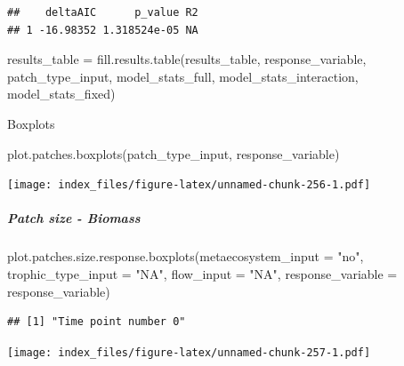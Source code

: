 \documentclass[
]{article}
\newenvironment{Shaded}{\begin{snugshade}}{\end{snugshade}}
\newcommand{\AttributeTok}[1]{\textcolor[rgb]{0.77,0.63,0.00}{#1}}
\newcommand{\FunctionTok}[1]{\textcolor[rgb]{0.00,0.00,0.00}{#1}}
\newcommand{\NormalTok}[1]{#1}
\newcommand{\OtherTok}[1]{\textcolor[rgb]{0.56,0.35,0.01}{#1}}
\newcommand{\StringTok}[1]{\textcolor[rgb]{0.31,0.60,0.02}{#1}}
\begin{document}
\begin{verbatim}
##    deltaAIC      p_value R2
## 1 -16.98352 1.318524e-05 NA
\end{verbatim}

\begin{Shaded}
\begin{Highlighting}[]
\NormalTok{results\_table }\OtherTok{=} \FunctionTok{fill.results.table}\NormalTok{(results\_table,}
\NormalTok{                                   response\_variable,}
\NormalTok{                                   patch\_type\_input,}
\NormalTok{                                   model\_stats\_full,}
\NormalTok{                                   model\_stats\_interaction,}
\NormalTok{                                   model\_stats\_fixed)}
\end{Highlighting}
\end{Shaded}

Boxplots

\begin{Shaded}
\begin{Highlighting}[]
\FunctionTok{plot.patches.boxplots}\NormalTok{(patch\_type\_input,}
\NormalTok{                       response\_variable)}
\end{Highlighting}
\end{Shaded}

\texttt{[image: index\_files/figure-latex/unnamed-chunk-256-1.pdf]}

\hypertarget{patch-size---biomass-1}{%
\subparagraph{Patch size - Biomass}\label{patch-size---biomass-1}}

\begin{Shaded}
\begin{Highlighting}[]
\FunctionTok{plot.patches.size.response.boxplots}\NormalTok{(}\AttributeTok{metaecosystem\_input =} \StringTok{"no"}\NormalTok{,}
                                  \AttributeTok{trophic\_type\_input =} \StringTok{"NA"}\NormalTok{,}
                                  \AttributeTok{flow\_input =} \StringTok{"NA"}\NormalTok{,}
                                  \AttributeTok{response\_variable =}\NormalTok{ response\_variable)}
\end{Highlighting}
\end{Shaded}

\begin{verbatim}
## [1] "Time point number 0"
\end{verbatim}

\texttt{[image: index\_files/figure-latex/unnamed-chunk-257-1.pdf]}
\end{document}
